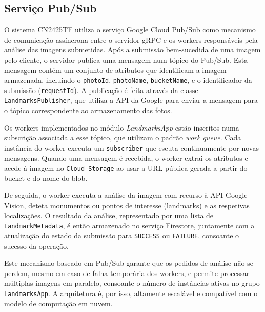 \subsection{Serviço Pub/Sub}
\label{ssec:pubsub_service}

O sistema CN2425TF utiliza o serviço Google Cloud Pub/Sub como mecanismo de
comunicação assíncrona entre o servidor gRPC e os workers responsáveis pela
análise das imagens submetidas. Após a submissão bem-sucedida de uma imagem
pelo cliente, o servidor publica uma mensagem num tópico do Pub/Sub. Esta
mensagem contém um conjunto de atributos que identificam a imagem armazenada,
incluindo o \texttt{photoId}, \texttt{photoName}, \texttt{bucketName}, e o
identificador da submissão (\texttt{requestId}). A publicação é feita através
da classe \texttt{LandmarksPublisher}, que utiliza a API da Google para enviar
a mensagem para o tópico correspondente ao armazenamento das fotos.

Os workers implementados no módulo \textit{LandmarksApp} estão inscritos numa
subscrição associada a esse tópico, que utilizam o padrão \textit{work queue}.
Cada instância do worker executa um \texttt{subscriber} que escuta
continuamente por novas mensagens. Quando uma mensagem é recebida, o worker
extrai os atributos e acede à imagem no \texttt{Cloud Storage} ao usar a URL
pública gerada a partir do bucket e do nome do blob.

De seguida, o worker executa a análise da imagem com recurso à API Google
Vision, deteta monumentos ou pontos de interesse (landmarks) e as respetivas
localizações. O resultado da análise, representado por uma lista de
\texttt{LandmarkMetadata}, é então armazenado no serviço Firestore, juntamente
com a atualização do estado da submissão para \texttt{SUCCESS} ou
\texttt{FAILURE}, consoante o sucesso da operação.

Este mecanismo baseado em Pub/Sub garante que os pedidos de análise não se
perdem, mesmo em caso de falha temporária dos workers, e permite processar
múltiplas imagens em paralelo, consoante o número de instâncias ativas no grupo
\texttt{LandmarksApp}. A arquitetura é, por isso, altamente escalável e
compatível com o modelo de computação em nuvem.

